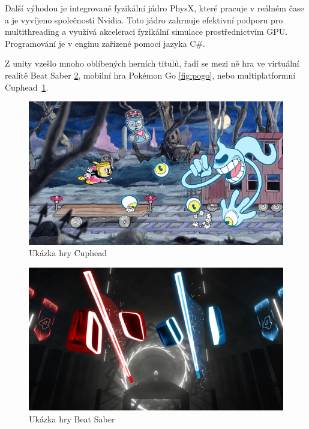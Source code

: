 Další výhodou je integrované fyzikální jádro PhysX, které pracuje v reálném čase a je vyvíjeno společností Nvidia. Toto jádro zahrnuje efektivní podporu pro multithreading a využívá akceleraci fyzikální simulace prostřednictvím GPU. Programování je v enginu zařízené pomocí jazyka C\#.

Z unity vzešlo mnoho oblíbených herních titulů, řadí se mezi ně hra ve virtuální realitě Beat Saber \ref{fig:beatSaber}, mobilní hra Pokémon Go \ref{fig:pogo}, nebo multiplatformní Cuphead~\ref{fig:cuphead}.
\begin{figure}[H]
	\centering
	\includegraphics[scale=0.61]{obrazky-figures/Cuphead.png}
	\caption{Ukázka hry Cuphead}
	\label{fig:cuphead}
\end{figure}
\begin{figure}[H]
	\centering
	\includegraphics[scale=0.15]{obrazky-figures/BeatSaber.jpg}
	\caption{Ukázka hry Beat Saber}
	\label{fig:beatSaber}
\end{figure}
